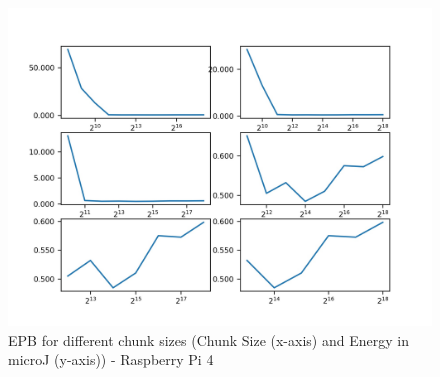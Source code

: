 \begin{figure}
    \begin{center}
        \includegraphics[scale=0.23]{Figs/epbpi.png}    
    \end{center}
    \caption{EPB for different chunk sizes (Chunk Size (x-axis) and Energy in microJ (y-axis)) - Raspberry Pi 4}
    \label{fig:epbpi}
\end{figure}

